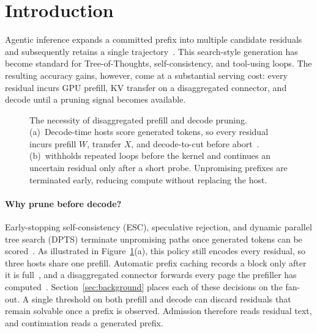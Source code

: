 \section{Introduction}
\label{sec:intro}

Agentic inference expands a committed prefix into multiple candidate residuals and subsequently retains a single trajectory~\citep{tot,react,selfconsistency}.
This search-style generation has become standard for Tree-of-Thoughts, self-consistency, and tool-using loops.
The resulting accuracy gains, however, come at a substantial serving cost: every residual incurs GPU prefill, KV transfer on a disaggregated connector, and decode until a pruning signal becomes available.

\begin{figure}[t]
\centering
\resizebox{\textwidth}{!}{}
\caption{The necessity of disaggregated prefill and decode pruning.
(a)~Decode-time hosts score generated tokens, so every residual incurs prefill $W$, transfer $X$, and decode-to-cut before abort~\citep{esc,specrej,dpts}.
(b)~\sys withholds repeated loops before the kernel and continues an uncertain residual only after a short probe.
Unpromising prefixes are terminated early, reducing compute without replacing the host.}
\label{fig:problem}
\end{figure}

\paragraph{Why prune before decode?}
Early-stopping self-consistency (ESC), speculative rejection, and dynamic parallel tree search (DPTS) terminate unpromising paths once generated tokens can be scored~\citep{esc,specrej,dpts}.
As illustrated in Figure~\ref{fig:problem}(a), this policy still encodes every residual, so three hosts share one prefill.
Automatic prefix caching records a block only after it is full~\citep{vllm,sglang}, and a disaggregated connector forwards every page the prefiller has computed~\citep{distserve,splitwise}.
Section~\ref{sec:background} places each of these decisions on the fan-out.
A single threshold on both prefill and decode can discard residuals that remain solvable once a prefix is observed.
Admission therefore reads residual text, and continuation reads a generated prefix.

